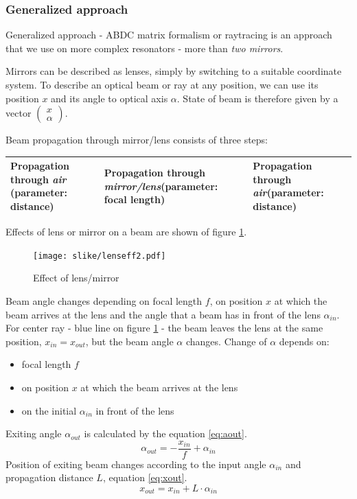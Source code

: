 \subsubsection{Generalized approach}
Generalized approach - ABDC matrix formalism or raytracing is an approach that we use on more complex resonators - more than \textit{two mirrors}.

Mirrors can be described as lenses, simply by switching to a suitable coordinate system. To describe an optical beam or ray at any position,
we can use its position $x$ and its angle to optical axis $\alpha$. State of beam is therefore given by a vector $\begin{pmatrix}
    x\\ \alpha \end{pmatrix}$.



Beam propagation through mirror/lens consists of three steps:
\begin{table}[h!]
    \centering
    \begin{tabular}{|p{2in}|p{2in}|p{2in}|}
       \hline
        Propagation through \textit{air} \newline(parameter: distance) &
         Propagation through \textit{mirror/lens}\newline (parameter: focal length) & 
         Propagation through \textit{air}\newline (parameter: distance)\\
        \hline
    \end{tabular}
\end{table}
Effects of lens or mirror on a beam are shown of figure \ref{fig:eff}.
\begin{figure}[h!]
    \centering
    \texttt{[image: slike/lenseff2.pdf]}
    \caption{Effect of  lens/mirror}
    \label{fig:eff}
\end{figure}
Beam angle changes depending on focal length $f$, on position $x$ at which the beam arrives at the lens and the angle that a beam has
in front of the lens $\alpha_{in}$.
For center ray - blue line on figure \ref{fig:eff} - the beam leaves the lens at the same position, $x_{in} = x_{out}$, but the beam angle $\alpha$ changes.
Change of $\alpha$ depends on:
\begin{itemize}
    \item focal length $f$
    \item on position $x$ at which the beam arrives at the lens
    \item on the initial $\alpha_{in}$ in front of the lens 
\end{itemize}
Exiting angle $\alpha_{out}$ is calculated by the equation \ref{eq:aout}.
\begin{equation}
    \alpha_{out} = -\frac{x_{in}}{f} + \alpha_{in}
    \label{eq:aout}  
\end{equation}
Position of exiting beam changes according to the input angle $\alpha_{in}$ and propagation distance $L$, equation \ref{eq:xout}.
\begin{equation}
    x_{out} = x_{in} + L \cdot \alpha_{in}
    \label{eq:xout}
\end{equation} 

